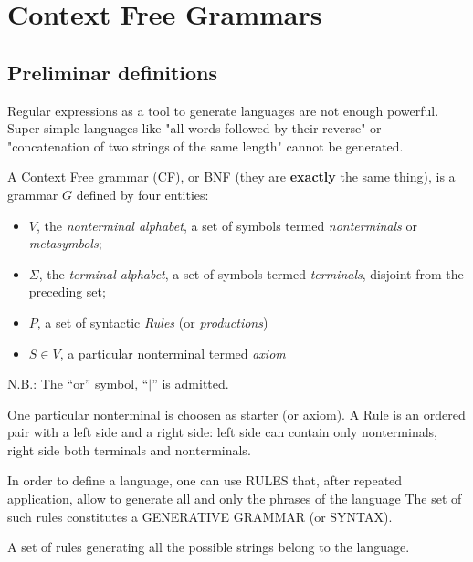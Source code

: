 \chapter{Context Free Grammars}
	\section{Preliminar definitions}
		Regular expressions as a tool to generate languages are not enough powerful. 
		Super simple languages like "all words followed by their reverse" or "concatenation of two strings of the same length" cannot be generated.

		\begin{definition}
			A Context Free grammar (CF), or BNF (they are \textbf{exactly} the same thing), is a grammar $G$ defined by four entities:
			\begin{itemize}
				\item $V$, the \emph{nonterminal alphabet}, a set of symbols termed \emph{nonterminals} or \emph{metasymbols};
				\item $\Sigma$, the \emph{terminal alphabet}, a set of symbols termed \emph{terminals}, disjoint from the preceding set;
				\item $P$, a set of syntactic \emph{Rules} (or \emph{productions})
				\item $S\in V$, a particular nonterminal termed \emph{axiom}
			\end{itemize}
			N.B.: The ``or'' symbol, ``$\vert$'' is admitted.%
		\end{definition}
		One particular nonterminal is choosen as starter (or axiom).
		A Rule is an ordered pair with a left side and a right side: left side can contain only nonterminals, right side both terminals and nonterminals. 
		
		In order to define a language, one can use RULES that, after repeated application, allow to generate all and only the phrases of the language
		The set of such rules constitutes a GENERATIVE GRAMMAR (or SYNTAX).

		\begin{definition}
			A set of rules generating all the possible strings belong to the language.
		\end{definition}


